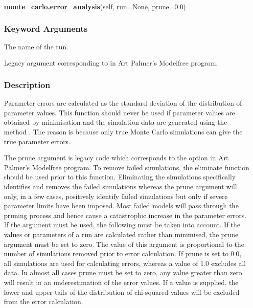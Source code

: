  \textsf{\textbf{monte\_carlo.error\_analysis}(self, run=None, prune=0.0)} 

  
 \subsubsection{Keyword Arguments} 

   The name of the run.   

   Legacy argument corresponding to  in Art Palmer's Modelfree program.  

  

  
 \subsubsection{Description} 

 Parameter errors are calculated as the standard deviation of the distribution of parameter values.  This function should never be used if parameter values are obtained by minimisation and the simulation data are generated using the method .  The reason is because only true Monte Carlo simulations can give the true parameter errors. 
  

 The prune argument is legacy code which corresponds to the  option in Art Palmer's Modelfree program.  To remove failed simulations, the eliminate function should be used prior to this function.  Eliminating the simulations specifically identifies and removes the failed simulations whereas the prune argument will only, in a few cases, positively identify failed simulations but only if severe parameter limits have been imposed.  Most failed models will pass through the pruning process and hence cause a catastrophic increase in the parameter errors.  If the argument must be used, the following must be taken into account. If the values or parameters of a run are calculated rather than minimised, the prune argument must be set to zero.  The value of this argument is proportional to the number of simulations removed prior to error calculation.  If prune is set to 0.0, all simulations are used for calculating errors, whereas a value of 1.0 excludes all data.  In almost all cases prune must be set to zero, any value greater than zero will result in an underestimation of the error values.  If a value is supplied, the lower and upper tails of the distribution of chi-squared values will be excluded from the error calculation. 
  

